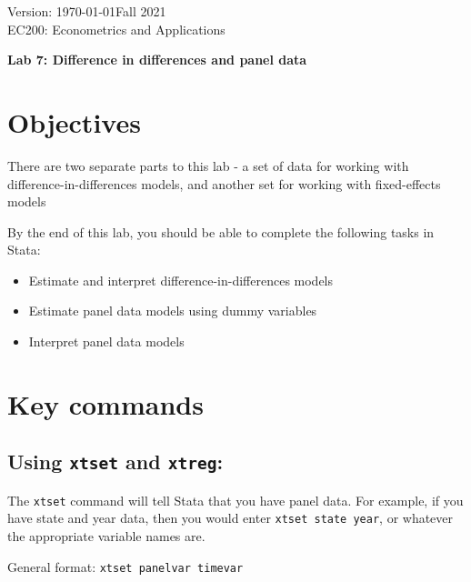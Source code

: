 \documentclass[11pt]{article}
\begin{document}
\thispagestyle{plain}
\singlespacing


Version: \today \hfill Fall 2021\\
EC200: Econometrics and Applications
\begin{center}
\Large{\textbf{Lab 7: Difference in differences and panel data}}\\
\end{center}
\bigskip



\hypertarget{objectives}{%
\section*{Objectives}\label{objectives}}

There are two separate parts to this lab - a set of data for working
with difference-in-differences models, and another set for working with
fixed-effects models

By the end of this lab, you should be able to complete the following
tasks in Stata:

\begin{itemize}
\item
  Estimate and interpret difference-in-differences models
\item
  Estimate panel data models using dummy variables
\item
  Interpret panel data models
\end{itemize}

\hypertarget{key-commands}{%
\section*{Key commands}\label{key-commands}}

\hypertarget{using-xtset-and-xtreg}{%
\subsection*{\texorpdfstring{Using \texttt{xtset} and
\texttt{xtreg}:}{Using xtset and xtreg:}}\label{using-xtset-and-xtreg}}

The \texttt{xtset} command will tell Stata that you have panel data. For
example, if you have state and year data, then you would enter
\texttt{xtset\ state\ year}, or whatever the appropriate variable names
are.

General format: \texttt{xtset\ panelvar\ timevar}
\end{document}
